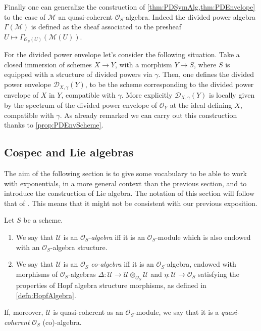 \begin{rem}[]
	Finally one can generalize the construction
	of \cref{thm:PDSymAlg,thm:PDEnvelope} to the case of $\mathcal{M}$
	an quasi-coherent $\mathcal{O}_{ S }$-algebra.
	Indeed the divided power algebra $\Gamma(\mathcal{M})$ is defined
	as the sheaf associated to the presheaf 
	$U \mapsto \Gamma_{\mathcal{O}_S(U)}(\mathcal{M}(U))$.

	For the divided power envelope let's consider the following situation.
	Take a closed immersion of schemes $X \to Y$, with a morphism $Y \to S$,
	where $S$ is equipped with a structure of divided powers via $\gamma$.
	Then, one defines the
	divided power envelope $\mathcal{D}_{X,\gamma}(Y)$, to be the scheme
	corresponding to the divided power envelope of $X$ in $Y$,
	compatible with $\gamma$.
	More explicitly $\mathcal{D}_{X,\gamma}(Y)$ is locally 
	given by the spectrum of the divided power envelope
	of $\mathcal{O}_{ Y }$ at the ideal defining $X$, compatible with $\gamma$.
	As already remarked we can carry out this construction
	thanks to \cref{prop:PDEnvScheme}.
\end{rem}


\subsection{Cospec and Lie algebras}
The aim of the following section is to give some vocabulary to
be able to work with exponentials, in a more general context than the previous section,
and to introduce the construction of Lie algebra.
The notation of this section will follow that of \cite[Capther III]{Messing}.
This means that it might not be consistent with our previous exposition.


\begin{defn}
	Let $S$ be a scheme.
\begin{enumerate}
\item We say that $\mathcal{U}$ is an $\mathcal{O}_{ S }$-\emph{algebra}
	iff it is an $\mathcal{O}_{ S }$-module
	which is also endowed with an $\mathcal{O}_{ S }$-algebra structure.
\item We say that $\mathcal{U}$ is an $\mathcal{O}_{ S }$ \emph{co-algebra}
	iff it is an $\mathcal{O}_{ S }$-algebra, endowed with
	morphisms of $\mathcal{O}_S$-algebras
	$\Delta\colon \mathcal{U} \to \mathcal{U} \otimes_{\mathcal{O}_{ S }} \mathcal{U}$
	and $\eta\colon \mathcal{U} \to \mathcal{O}_{ S }$
	satisfying the properties of Hopf algebra structure morphisms,
	as defined in \cref{defn:HopfAlgebra}.
\end{enumerate}
	If, moreover, $\mathcal{U}$ is quasi-coherent as an $\mathcal{O}_{ S }$-module,
	we say that it is a \emph{quasi-coherent} $\mathcal{O}_{ S }$ (co)-algebra.
\end{defn}


